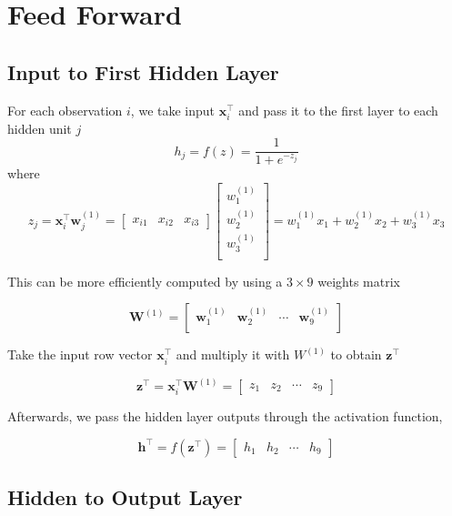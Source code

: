 \documentclass[11pt]{article}%
\begin{document}
	
	
\section{Feed Forward}

\subsection{Input to First Hidden Layer}

For each observation $i$, we take input $\mathbf{x}^\intercal_i$ and pass it to the first layer to each hidden unit $j$
	$$
	h_j = f(z) = \frac{1}{1 + e^{-z_j}}
	$$
	where 
	$$
	z_j = \mathbf{x}^\intercal_i \mathbf{w}^{(1)}_j 
	= \begin{bmatrix}
	x_{i1} & x_{i2} & x_{i3}
\end{bmatrix}
	\begin{bmatrix}
	w^{(1)}_1 \\
	w^{(1)}_2 \\
	w^{(1)}_3 \\
	\end{bmatrix}
	= w^{(1)}_1 x_1 + w^{(1)}_2 x_2 + w^{(1)}_3 x_3 
	$$
	
	This can be more efficiently computed by using a $3 \times 9$ weights matrix 
	
	$$
	\mathbf{W}^{(1)} = \begin{bmatrix}
	\mathbf{w}^{(1)}_1 &  \mathbf{w}^{(1)}_2 & \cdots & \mathbf{w}^{(1)}_9 \\
	\end{bmatrix}
	$$
	
	Take the input row vector $\mathbf{x}^\intercal_i$ and multiply it with $W^{(1)}$ to obtain $\mathbf{z}^\intercal$
	
	$$
	\mathbf{z}^\intercal = \mathbf{x}^\intercal_i \mathbf{W}^{(1)}
	= \begin{bmatrix}
	z_1 & z_2 & \cdots & z_9
	\end{bmatrix}
	$$
	
	Afterwards, we pass the hidden layer outputs through the activation function,
	
	$$
	\mathbf{h}^\intercal = f(\mathbf{z}^\intercal)
	= \begin{bmatrix}
	h_1 & h_2 & \cdots & h_9
	\end{bmatrix}
	$$
	
	
\subsection{Hidden to Output Layer}
\end{document}
